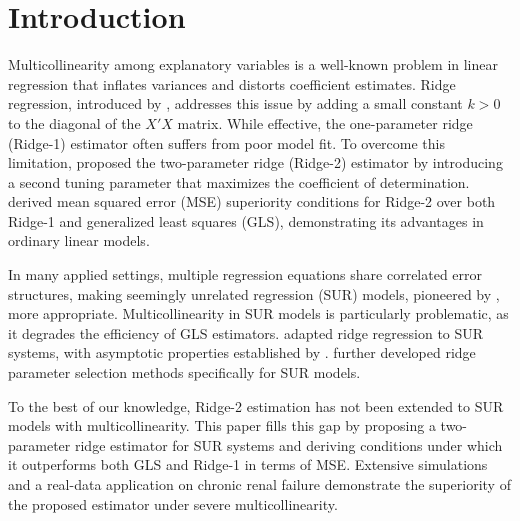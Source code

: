 \documentclass[twoside]{article}
\begin{document}
\section{Introduction}

Multicollinearity among explanatory variables is a well-known problem in linear regression that inflates variances and distorts coefficient estimates. Ridge regression, introduced by \cite{hoerl1970}, addresses this issue by adding a small constant $k > 0$ to the diagonal of the $X'X$ matrix. While effective, the one-parameter ridge (Ridge-1) estimator often suffers from poor model fit. To overcome this limitation, \cite{lipovetsky2005} proposed the two-parameter ridge (Ridge-2) estimator by introducing a second tuning parameter that maximizes the coefficient of determination. \cite{toker2013} derived mean squared error (MSE) superiority conditions for Ridge-2 over both Ridge-1 and generalized least squares (GLS), demonstrating its advantages in ordinary linear models.

In many applied settings, multiple regression equations share correlated error structures, making seemingly unrelated regression (SUR) models, pioneered by \cite{zellner1962}, more appropriate. Multicollinearity in SUR models is particularly problematic, as it degrades the efficiency of GLS estimators. \cite{firinguetti1997} adapted ridge regression to SUR systems, with asymptotic properties established by \cite{firinguetti2008}. \cite{alkhamisi2008} further developed ridge parameter selection methods specifically for SUR models.

To the best of our knowledge, Ridge-2 estimation has not been extended to SUR models with multicollinearity. This paper fills this gap by proposing a two-parameter ridge estimator for SUR systems and deriving conditions under which it outperforms both GLS and Ridge-1 in terms of MSE. Extensive simulations and a real-data application on chronic renal failure demonstrate the superiority of the proposed estimator under severe multicollinearity.
\end{document}
